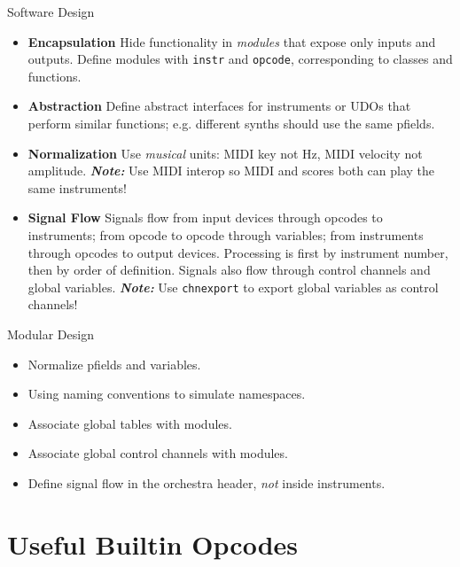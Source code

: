 \documentclass{beamer}
\begin{document}
    \begin{frame}{Software Design}
        \begin{itemize}
            \item \textbf{Encapsulation} Hide functionality in \textit{modules} that
            expose only inputs and outputs. Define modules with \texttt{instr} and
            \texttt{opcode}, corresponding to classes and functions.
            \item \textbf{Abstraction} Define abstract interfaces for instruments or
            UDOs that perform similar functions; e.g. different synths should use the same
            pfields.
            \item \textbf{Normalization} Use \textit{musical} units: MIDI key not
            Hz, MIDI velocity not amplitude. \textit{\textbf{Note:}} Use MIDI interop so
            MIDI and scores both can play the same instruments!
            \item \textbf{Signal Flow} Signals flow from input devices through
            opcodes to instruments; from opcode to opcode through variables; from
            instruments through opcodes to output devices. Processing is first by
            instrument number, then by order of definition. Signals also flow through
            control channels and global variables. \textit{\textbf{Note:}} Use
            \texttt{chnexport} to  export global variables as control channels!
        \end{itemize}
    \end{frame}
    
    \begin{frame}{Modular Design}
        \begin{itemize}
            \item Normalize pfields and variables.
            \item Using naming conventions to simulate namespaces.
            \item Associate global tables with modules.
            \item Associate global control channels with modules.
            \item Define signal flow in the orchestra header, \textit{not} inside instruments.
        \end{itemize}
    \end{frame}
    
    \section{Useful Builtin Opcodes}
    
\end{document}
